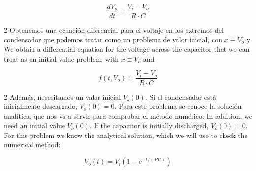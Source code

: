 \begin{equation*}
\frac{dV_o}{dt}=\frac{V_i-V_o}{R \cdot C}
\end{equation*}
\begin{paracol}{2}
Obtenemos una ecuación diferencial para el voltaje en los extremos del condensador que podemos tratar como un problema de valor inicial, con $x\equiv V_o$ y
\switchcolumn
We obtain a differential equation for the voltage across the capacitor that we can treat as an initial value problem, with $x\equiv V_o$ and
\end{paracol}
\begin{equation*}
f(t,V_o) = \frac{V_i-V_o}{R \cdot C}
\end{equation*}
\begin{paracol}{2}
Además, necesitamos un valor inicial $V_o(0)$. Si el condensador está inicialmente descargado, $V_o(0)=0$. Para este problema se conoce la solución analítica, que nos va a servir para comprobar el método numérico:
\switchcolumn
In addition, we need an initial value $V_o(0)$. If the capacitor is initially discharged, $V_o(0) = 0$. For this problem we know the analytical solution, which we will use to check the numerical method:
\end{paracol}
\begin{equation*}
V_o(t)=V_i\left(1-e^{-t/(RC)}\right)
\end{equation*}

